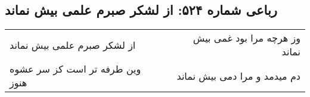 \begin{center}
\section*{رباعی شماره ۵۲۴: از لشکر صبرم علمی بیش نماند}
\label{sec:0524}
\begin{longtable}{l p{0.5cm} r}
از لشکر صبرم علمی بیش نماند
&&
وز هرچه مرا بود غمی بیش نماند
\\
وین طرفه تر است کز سر عشوه هنوز
&&
دم میدمد و مرا دمی بیش نماند
\\
\end{longtable}
\end{center}
